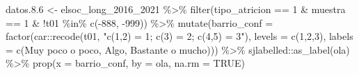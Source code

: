 \documentclass[
  12pt,
]{book}
\newenvironment{Shaded}{\begin{snugshade}}{\end{snugshade}}
\newcommand{\AttributeTok}[1]{\textcolor[rgb]{0.77,0.63,0.00}{#1}}
\newcommand{\ConstantTok}[1]{\textcolor[rgb]{0.00,0.00,0.00}{#1}}
\newcommand{\DecValTok}[1]{\textcolor[rgb]{0.00,0.00,0.81}{#1}}
\newcommand{\FloatTok}[1]{\textcolor[rgb]{0.00,0.00,0.81}{#1}}
\newcommand{\FunctionTok}[1]{\textcolor[rgb]{0.00,0.00,0.00}{#1}}
\newcommand{\NormalTok}[1]{#1}
\newcommand{\OtherTok}[1]{\textcolor[rgb]{0.56,0.35,0.01}{#1}}
\newcommand{\SpecialCharTok}[1]{\textcolor[rgb]{0.00,0.00,0.00}{#1}}
\newcommand{\StringTok}[1]{\textcolor[rgb]{0.31,0.60,0.02}{#1}}
\begin{document}
\begin{Shaded}
\begin{Highlighting}[]
\NormalTok{datos.}\FloatTok{8.6} \OtherTok{\textless{}{-}}\NormalTok{ elsoc\_long\_2016\_2021 }\SpecialCharTok{\%\textgreater{}\%} 
  \FunctionTok{filter}\NormalTok{(tipo\_atricion }\SpecialCharTok{==} \DecValTok{1} \SpecialCharTok{\&}\NormalTok{ muestra }\SpecialCharTok{==} \DecValTok{1} \SpecialCharTok{\&} \SpecialCharTok{!}\NormalTok{t01 }\SpecialCharTok{\%in\%} \FunctionTok{c}\NormalTok{(}\SpecialCharTok{{-}}\DecValTok{888}\NormalTok{, }\SpecialCharTok{{-}}\DecValTok{999}\NormalTok{)) }\SpecialCharTok{\%\textgreater{}\%} 
  \FunctionTok{mutate}\NormalTok{(}\AttributeTok{barrio\_conf =} \FunctionTok{factor}\NormalTok{(car}\SpecialCharTok{::}\FunctionTok{recode}\NormalTok{(t01, }\StringTok{"c(1,2) = 1; c(3) = 2; c(4,5) = 3"}\NormalTok{),}
                               \AttributeTok{levels =} \FunctionTok{c}\NormalTok{(}\DecValTok{1}\NormalTok{,}\DecValTok{2}\NormalTok{,}\DecValTok{3}\NormalTok{),}
                               \AttributeTok{labels =} \FunctionTok{c}\NormalTok{(}\StringTok{\textquotesingle{}Muy poco o poco\textquotesingle{}}\NormalTok{, }\StringTok{\textquotesingle{}Algo\textquotesingle{}}\NormalTok{, }\StringTok{\textquotesingle{}Bastante o mucho\textquotesingle{}}\NormalTok{))) }\SpecialCharTok{\%\textgreater{}\%}
\NormalTok{  sjlabelled}\SpecialCharTok{::}\FunctionTok{as\_label}\NormalTok{(ola) }\SpecialCharTok{\%\textgreater{}\%}
  \FunctionTok{prop}\NormalTok{(}\AttributeTok{x =}\NormalTok{ barrio\_conf, }\AttributeTok{by =}\NormalTok{ ola, }\AttributeTok{na.rm =} \ConstantTok{TRUE}\NormalTok{)}


\end{Highlighting}
\end{Shaded}
\end{document}
